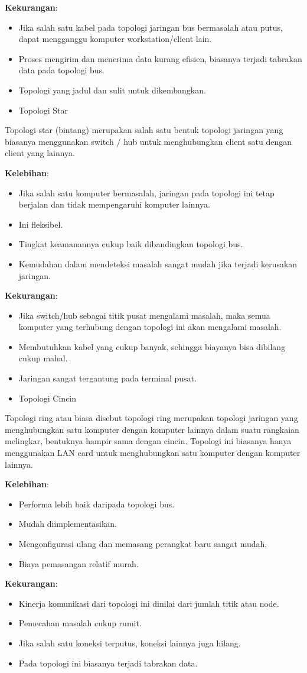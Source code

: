 \documentclass[11pt]{article}
\begin{document}
\textbf{Kekurangan}:
\begin{itemize}
\item Jika salah satu kabel pada topologi jaringan bus bermasalah atau putus, dapat mengganggu komputer workstation/client lain.
\item Proses mengirim dan menerima data kurang efisien, biasanya terjadi tabrakan data pada topologi bus.
\item Topologi yang jadul dan sulit untuk dikembangkan.

\item Topologi Star
\end{itemize}
Topologi star (bintang) merupakan salah satu bentuk topologi jaringan yang biasanya menggunakan switch / hub untuk menghubungkan client satu dengan client yang lainnya.

\textbf{Kelebihan}:
\begin{itemize}
\item Jika salah satu komputer bermasalah, jaringan pada topologi ini tetap berjalan dan tidak mempengaruhi komputer lainnya.
\item Ini fleksibel.
\item Tingkat keamanannya cukup baik dibandingkan topologi bus.
\item Kemudahan dalam mendeteksi masalah sangat mudah jika terjadi kerusakan jaringan.
\end{itemize}

\textbf{Kekurangan}:
\begin{itemize}
\item Jika switch/hub sebagai titik pusat mengalami masalah, maka semua komputer yang terhubung dengan topologi ini akan mengalami masalah.
\item Membutuhkan kabel yang cukup banyak, sehingga biayanya bisa dibilang cukup mahal.
\item Jaringan sangat tergantung pada terminal pusat.

\item Topologi Cincin
\end{itemize}
Topologi ring atau biasa disebut topologi ring merupakan topologi jaringan yang menghubungkan satu komputer dengan komputer lainnya dalam suatu rangkaian melingkar, bentuknya hampir sama dengan cincin. Topologi ini biasanya hanya menggunakan LAN card untuk menghubungkan satu komputer dengan komputer lainnya.

\textbf{Kelebihan}:
\begin{itemize}
\item Performa lebih baik daripada topologi bus.
\item Mudah diimplementasikan.
\item Mengonfigurasi ulang dan memasang perangkat baru sangat mudah.
\item Biaya pemasangan relatif murah.
\end{itemize}

\textbf{Kekurangan}:
\begin{itemize}
\item Kinerja komunikasi dari topologi ini dinilai dari jumlah titik atau node.
\item Pemecahan masalah cukup rumit.
\item Jika salah satu koneksi terputus, koneksi lainnya juga hilang.
\item Pada topologi ini biasanya terjadi tabrakan data.
\end{itemize}
\end{document}
